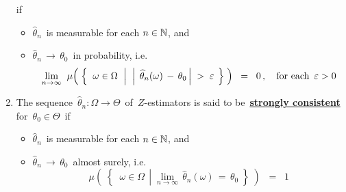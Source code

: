 \begin{definition}[$Z$-Estimators]
\begin{enumerate}
	if
	\begin{itemize}
	\item
		$\widehat{\theta}_{n}$\, is measurable for each $n\in\mathbb{N}$, and
	\item
		$\widehat{\theta}_{n} \,\longrightarrow\, \theta_{0}$\, in probability,
		i.e.
		\begin{equation*}
		\underset{n\rightarrow\infty}{\lim}\;\;
		\mu\!\left(\;\left\{\;\;
			\omega \in \Omega
			\;\,\left\vert\;\;
				\left\vert\;\,\widehat{\theta}_{n}(\omega) \, - \, \theta_{0}\,\right\vert \; > \; \varepsilon
				\right.
			\;\right\}\;\right)
		\;\; = \;\;
			0\,,
		\quad
		\textnormal{for each \,$\varepsilon > 0$}
		\end{equation*}
	\end{itemize}
\item
	The sequence
	\,$\widehat{\theta}_{n} : \Omega \longrightarrow \Theta$\,
	of \,$Z$-estimators is said to be
	\,\underline{\textbf{strongly consistent}}\; for \,$\theta_{0} \in \Theta$\,
	if
	\begin{itemize}
	\item
		$\widehat{\theta}_{n}$\, is measurable for each $n\in\mathbb{N}$, and
	\item
		$\widehat{\theta}_{n} \,\longrightarrow\, \theta_{0}$\, almost surely,
		i.e.
		\begin{equation*}
		\mu\!\left(\;\left\{\;\;
			\omega \in \Omega
			\;\,\left\vert\;
				\underset{n\rightarrow\infty}{\lim}\, \widehat{\theta}_{n}(\omega) \, = \, \theta_{0}
				\right.
			\;\right\}\;\right)
		\;\; = \;\;
			1
		\end{equation*}
	\end{itemize}
\end{enumerate}
\end{definition}



\renewcommand{\theenumi}{\roman{enumi}}
\renewcommand{\labelenumi}{\textnormal{(\theenumi)}$\;\;$}

